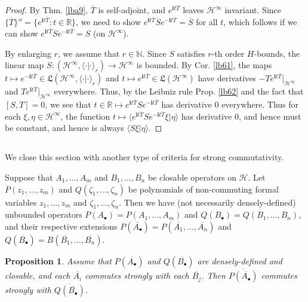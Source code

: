 \documentclass[12pt,b5paper,notitlepage]{article}
\theoremstyle{definition}
\theoremstyle{plain}
\newtheorem{pp}[df]{Proposition}
\newcommand{\fk}{\mathfrak}
\newcommand{\mc}{\mathcal}
\newcommand{\ovl}{\overline}
\newcommand{\bk}[1]{\langle {#1}\rangle}
\newcommand{\im}{\mathbf{i}}
\newcommand{\blt}{\bullet}
\newcommand{\Nbb}{\mathbb N}
\newcommand{\Rbb}{\mathbb R}
\numberwithin{equation}{section}
\begin{document}
\begin{proof}
By Thm. \ref{lba9}, $\ovl T$ is self-adjoint, and $e^{\im t\ovl T}$ leaves $\mc H^\infty$ invariant. Since $\{\ovl T\}''=\{e^{\im t\ovl T}:t\in\Rbb\}$, we need to show $e^{\im t\ovl T}\ovl Se^{-\im t\ovl T}=\ovl S$ for all $t$, which follows if we can show $e^{\im t\ovl T}Se^{-\im t\ovl T}=S$ (on $\mc H^\infty$).

By enlarging $r$, we assume that $r\in\Nbb$. Since $S$ satisfies $r$-th order $H$-bounds, the linear map $S:(\mc H^\infty,\bk{\cdot|\cdot}_r)\rightarrow\mc H^\infty$ is bounded. By Cor. \ref{lb61}, the maps $t\mapsto e^{-\im t\ovl T}\in\fk L(\mc H^\infty,\bk{\cdot|\cdot}_r)$ and $t\mapsto e^{\im t\ovl T}\in\fk L(\mc H^\infty)$ have derivatives $-Te^{\im t\ovl T}|_{\mc H^\infty}$ and $Te^{\im t\ovl T}|_{\mc H^\infty}$ everywhere. Thus, by the Leibniz rule Prop. \ref{lb62} 
and the fact that $[S,T]=0$, we see that $t\in\Rbb\mapsto e^{\im t\ovl T}Se^{-\im t\ovl T}$ has derivative $0$ everywhere. Thus for each $\xi,\eta\in\mc H^\infty$, the function $t\mapsto \bk{e^{\im t\ovl T}Se^{-\im t\ovl T}\xi|\eta}$ has derivative $0$, and hence must be constant, and hence is always $\bk{S\xi|\eta}$.
\end{proof}


\subsection{}

We close this section with another type of criteria for strong commutativity. %


Suppose that $A_1,\dots,A_m$ and $B_1,\dots,B_n$ be closable operators on $\mc H$. Let $P(z_1,\dots,z_m)$ and $Q(\zeta_1,\dots,\zeta_n)$ be polynomials of non-commuting formal variables $z_1,\dots,z_m$ and $\zeta_1,\dots,\zeta_n$. Then we have (not necessarily densely-defined) unbounded operators $P(A_\blt)=P(A_1,\dots,A_m)$ and $Q(B_\blt)=Q(B_1,\dots,B_n)$, and their respective extensions $P(\ovl {A_\blt})=P(\ovl {A_1},\dots,\ovl {A_n})$ and $Q(\ovl{B_\blt})=B(\ovl{B_1},\dots,\ovl{B_n})$.


\begin{pp}
Assume that $P(\ovl{A_\blt})$ and $Q(\ovl{B_\blt})$ are densely-defined and closable, and each $\ovl{A_i}$ commutes strongly with each $\ovl{B_j}$. Then $\ovl{P(\ovl{A_\blt})}$ commutes strongly with $\ovl{Q(\ovl{B_\blt})}$.
\end{pp}
\end{document}

